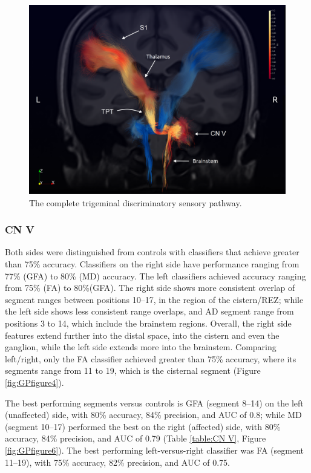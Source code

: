 \begin{figure}[ht]
\centering
\includegraphics[width=\linewidth]{view-left-right.png}
\caption{The complete trigeminal discriminatory sensory pathway. }
\label{fig:GPfigure3}
\end{figure}

\subsubsection{CN V}
Both sides were distinguished from controls with classifiers that achieve greater than 75\% accuracy. 
Classifiers on the right side have performance ranging from 77\% (GFA) to 80\% (MD) accuracy. The left classifiers achieved accuracy ranging from 75\% (FA) to 80\%(GFA). The right side shows more consistent overlap of segment ranges between positions 10--17, in the region of the cistern/REZ; while the left side shows less consistent range overlaps, and AD segment range from positions 3 to 14, which include the brainstem regions. Overall, the right side features extend further into the distal space, into the cistern and even the ganglion, while the left side extends more into the brainstem. Comparing left/right, only the FA classifier achieved greater than 75\% accuracy, where its segments range from 11 to 19, which is the cisternal segment (Figure \ref{fig:GPfigure4}). 

The best performing segments versus controls is GFA (segment 8--14) on the left (unaffected) side, with 80\% accuracy, 84\% precision, and AUC of 0.8; while MD (segment 10--17) performed the best on the right (affected) side, with 80\% accuracy, 84\% precision, and AUC of 0.79 (Table \ref{table:CN V}, Figure \ref{fig:GPfigure6}). The best performing left-versus-right classifier was FA (segment 11--19), with 75\% accuracy, 82\% precision, and AUC of 0.75.

